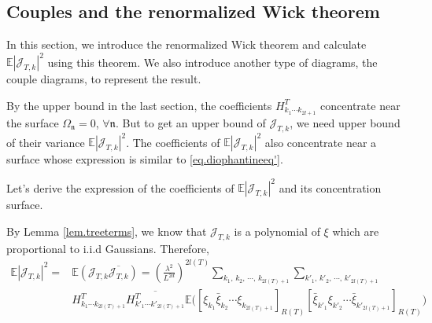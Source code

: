 \subsection{Couples and the renormalized Wick theorem} \label{sec.coupwick} In this section, we introduce the renormalized Wick theorem and calculate $\mathbb{E}|\mathcal{J}_{T,k}|^2$ using this theorem. We also introduce another type of diagrams, the couple diagrams, to represent the result.


By the upper bound in the last section, the coefficients $H^T_{k_1\cdots k_{2l+1}}$ concentrate near the surface $\Omega_{\mathfrak{n}}=0$, $\forall \mathfrak{n}$. But to get an upper bound of $\mathcal{J}_{T,k}$, we need upper bound of their variance $\mathbb{E}|\mathcal{J}_{T,k}|^2$. The coefficients of $\mathbb{E}|\mathcal{J}_{T,k}|^2$ also concentrate near a surface whose expression is similar to \eqref{eq.diophantineeq'}. 

Let's derive the expression of the coefficients of $\mathbb{E}|\mathcal{J}_{T,k}|^2$ and its concentration surface.



By Lemma \ref{lem.treeterms}, we know that $\mathcal{J}_{T,k}$ is a polynomial of $\xi$ which are proportional to i.i.d Gaussians. Therefore, 
\begin{equation}\label{eq.termexp1}
\begin{split}
    \mathbb{E}|\mathcal{J}_{T,k}|^2=&\mathbb{E}(\mathcal{J}_{T,k}\overline{\mathcal{J}_{T,k}})=\left(\frac{\lambda^2}{L^{2d}}\right)^{2l(T)}
    \sum_{k_1,\, k_2,\, \cdots,\, k_{2l(T)+1}}\sum_{k'_1,\, k'_2,\, \cdots,\, k'_{2l(T)+1}}
    \\[0.5em]
    & H^T_{k_1\cdots k_{2l(T)+1}} \overline{H^{T}_{k'_1\cdots k'_{2l(T)+1}}}  \mathbb{E}\Big([\xi_{k_1}\bar{\xi}_{k_2}\cdots\xi_{k_{2l(T)+1}}]_{R(T)}
    [\bar{\xi}_{k'_1}\xi_{k'_2}\cdots\bar{\xi}_{k'_{2l(T)+1}}]_{R(T)}\Big)
\end{split}
\end{equation}

